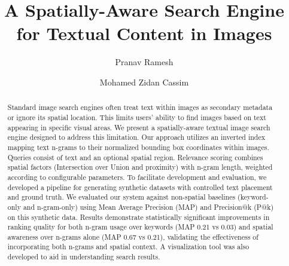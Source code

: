 \documentclass[sigconf,screen]{acmart}
\begin{document}
\title{A Spatially-Aware Search Engine for Textual Content in Images}

\author{Pranav Ramesh}

\author{Mohamed Zidan Cassim}

\renewcommand{\shortauthors}{Ramesh and Cassim}

\begin{abstract}
    Standard image search engines often treat text within images as secondary metadata or ignore its spatial location. This limits users' ability to find images based on text appearing in specific visual areas. We present a spatially-aware textual image search engine designed to address this limitation. Our approach utilizes an inverted index mapping text n-grams to their normalized bounding box coordinates within images. Queries consist of text and an optional spatial region. Relevance scoring combines spatial factors (Intersection over Union and proximity) with n-gram length, weighted according to configurable parameters. To facilitate development and evaluation, we developed a pipeline for generating synthetic datasets with controlled text placement and ground truth. We evaluated our system against non-spatial baselines (keyword-only and n-gram-only) using Mean Average Precision (MAP) and Precision@k (P@k) on this synthetic data. Results demonstrate statistically significant improvements in ranking quality for both n-gram usage over keywords (MAP 0.21 vs 0.03) and spatial awareness over n-grams alone (MAP 0.67 vs 0.21), validating the effectiveness of incorporating both n-grams and spatial context. A visualization tool was also developed to aid in understanding search results.
\end{abstract}
\end{document}

